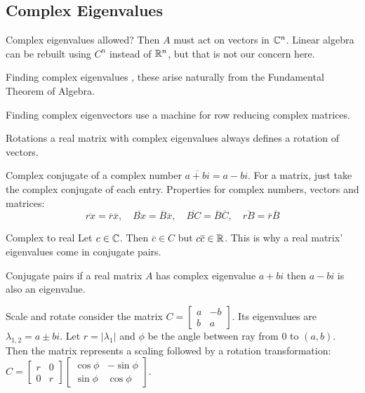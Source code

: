 \begin{card}
    \subsection{Complex Eigenvalues}

    \begin{compactdesc}
    \item[Complex eigenvalues] allowed? Then $A$ must act on vectors in $\mathbb{C}^n$.
        Linear algebra can be rebuilt using $C^n$ instead of $\mathbb{R}^n$,
        but that is not our concern here.
    \item[Finding complex eigenvalues], these arise naturally from the Fundamental
        Theorem of Algebra.
    \item[Finding complex eigenvectors] use a machine for row reducing complex
        matrices.
    \item[Rotations] a real matrix with complex eigenvalues always defines
        a rotation of vectors.
    \item[Complex conjugate] of a complex number $\overline{a + bi} = a - bi$.
        For a matrix, just take the complex conjugate of each entry.
        Properties for complex numbers, vectors and matrices:
        $$\overline{rx} = \overline{r}\overline{x}
        , \quad \overline{Bx} = \overline{B}\overline{x}
        , \quad \overline{BC} = \overline{B}\overline{C}
        , \quad \overline{rB} = \overline{r}\overline{B}$$
    \item[Complex to real] Let $c \in \mathbb{C}$. Then $\overline{c} \in C$
        but $c\overline{c} \in \mathbb{R}$. This is why a real matrix' eigenvalues
        come in conjugate pairs.
    \item[Conjugate pairs] if a real matrix $A$ has complex eigenvalue $a + bi$
        then $a - bi$ is also an eigenvalue.
    \item[Scale and rotate] consider the matrix
        $C = \left[\begin{smallmatrix}a & -b \\ b & a\end{smallmatrix}\right]$.
        Its eigenvalues are $\lambda_{1,2} = a \pm bi$. Let $r = |\lambda_1|$
        and $\phi$ be the angle between ray from $0$ to $(a,b)$.
        Then the matrix represents a scaling followed by a rotation transformation:
        $C = \left[\begin{smallmatrix} r & 0 \\ 0 & r \end{smallmatrix}\right]
        \left[\begin{smallmatrix} \cos\phi & -\sin\phi \\ \sin\phi & \cos\phi \end{smallmatrix}\right]$.

\end{compactdesc}
\end{card}
